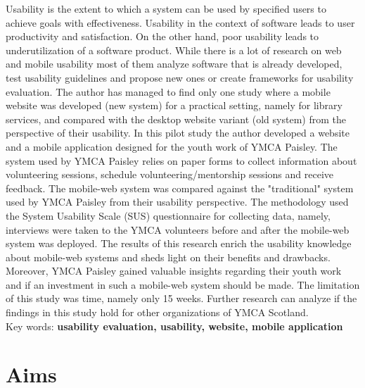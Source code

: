 \documentclass[version=last,fontsize=13pt]{scrartcl}
\begin{document}

Usability is the extent to which a system can be used by specified users to achieve goals with effectiveness. Usability in the context of software leads to user productivity and satisfaction. On the other hand, poor usability leads to underutilization of a software product. While there is a lot of research on web and mobile usability most of them analyze software that is already developed, test usability guidelines and propose new ones or create frameworks for usability evaluation. The author has managed to find only one study where a mobile website was developed (new system) for a practical setting, namely for library services, and compared with the desktop website variant (old system) from the perspective of their usability.  In this pilot study the author developed a website and a mobile application designed for the youth work of YMCA Paisley. The  system used by YMCA Paisley relies on paper forms to collect information about volunteering sessions, schedule volunteering/mentorship sessions and receive feedback. The mobile-web system was compared against the "traditional" system used by YMCA Paisley from their usability perspective. The methodology used the System Usability Scale (SUS) questionnaire for collecting data, namely, interviews were taken to the YMCA volunteers before and after the mobile-web system was deployed. The results of this research enrich the usability knowledge about mobile-web systems and sheds light on their benefits and drawbacks. Moreover, YMCA Paisley gained valuable insights regarding their youth work and if an investment in such a mobile-web system should be made. The limitation of this study was time, namely only 15 weeks. Further research can analyze if the findings in this study hold for other organizations of YMCA Scotland.\\

Key words: \textbf{usability evaluation, usability, website, mobile application}

\pagebreak

\section{Aims}
\end{document}
